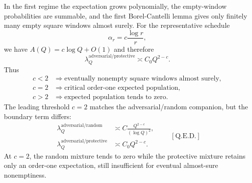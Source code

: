 In the first regime the expectation grows polynomially, the empty-window probabilities are summable, and the first Borel-Cantelli lemma gives only finitely many empty square windows almost surely.
For the representative schedule
\begin{equation*}
\alpha_r= c\frac{\log r}{r},
\end{equation*}
we have $A(Q)=c\log Q+O(1)$ and therefore
\begin{equation*}
\lambda_Q^{\mathrm{adversarial/protective}}\asymp C_0Q^{2-c}.
\end{equation*}
Thus
\begin{equation*}
\begin{aligned}
c < 2
&\Longrightarrow
\text{eventually nonempty square windows almost surely},\\
c=2
&\Longrightarrow
\text{critical order-one expected population},\\
c > 2
&\Longrightarrow
\text{expected population tends to zero}.
\end{aligned}
\end{equation*}
The leading threshold $c=2$ matches the adversarial/random companion, but the boundary term differs:
\begin{equation*}
\begin{aligned}
\lambda_Q^{\mathrm{adversarial/random}}
&\asymp C\frac{Q^{2-c}}{(\log Q)^2},\\
\lambda_Q^{\mathrm{adversarial/protective}}
&\asymp C_0Q^{2-c}.
\end{aligned}
\qquad[\text{Q.E.D.}]
\end{equation*}
At $c=2$, the random mixture tends to zero while the protective mixture retains only an order-one expectation, still insufficient for eventual almost-sure nonemptiness.

